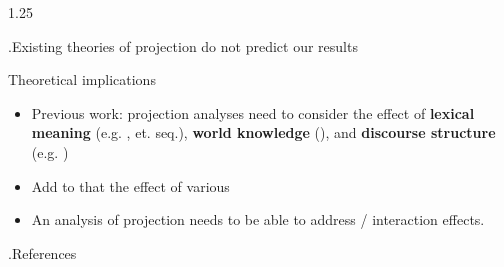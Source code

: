 \documentclass[final, table]{beamer}
\newlength{\colwidth}
\newlength{\vboxsep}
\begin{document}
\begin{frame}[t]
\begin{columns}[t]
\begin{column}{1.25\colwidth}
\begin{normalbox}{\phantom.\hfill Existing theories of projection do not predict our results}
			\end{normalbox}

			\vspace{\vboxsep}
			\begin{upshotbox}{Theoretical implications}
				\begin{itemize}
					\item Previous work: projection analyses need to consider the effect of \textbf{lexical meaning} (e.g. \citealt{kiparsky_fact_1970,karttunen_observations_1971}, et. seq.), \textbf{world knowledge} (\citealt{de_marneffe_did_2012,degen_prior_2021}), and \textbf{discourse structure} (e.g. \citealt{simons_best_2017,tonhauser_how_2018})
					
					\item Add to that the effect of various 
					
					\item An analysis of projection needs to be able to address  /  interaction effects.

				\end{itemize}
			\end{upshotbox}

			\vspace{\vboxsep}
			\begin{normalbox}{\phantom.\hfill References}
				\tiny
				

\end{normalbox}
\end{column}
\end{columns}
\end{frame}
\end{document}
